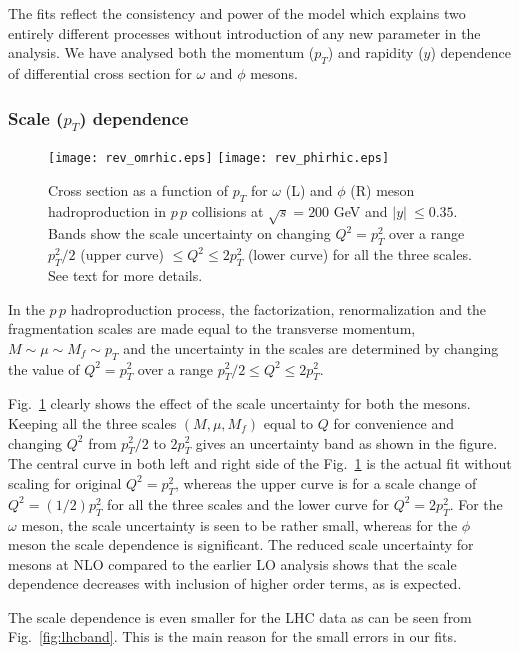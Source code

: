 \documentclass{ws-ijmpa}
\def\om{{\omega}}
\begin{document}
The fits reflect the consistency and power of the model which explains two
entirely different processes without introduction of any new parameter in
the analysis.  We have analysed both the momentum ($p_T$) and rapidity
($y$) dependence of differential cross section for $\omega$ and $\phi$
mesons.

\subsubsection{Scale ($p_T$) dependence} 
\label{sssec:num1}

\begin{figure}[htp]
\texttt{[image: rev\_omrhic.eps]}
\texttt{[image: rev\_phirhic.eps]}
\vspace*{8pt}
\caption{Cross section as a function of $p_T$ for $\omega$ (L) and $\phi$
(R) meson hadroproduction in $p\,p$ collisions at $\sqrt{s} = 200$ GeV and
$\vert y\vert \ \le 0.35$. Bands show the scale uncertainty on changing
$Q^2=p_T^2$ over a range $p_T^2/2$ (upper curve) $\le Q^2 \le 2 p_T^2$
(lower curve) for all the three scales. See text for more details.}
\label{fig:band}
\end{figure}

In the $p\,p$ hadroproduction process, the factorization, renormalization
and the fragmentation scales are made equal to the transverse momentum,
$M \sim \mu \sim M_f \sim p_T$ and the uncertainty in the scales are
determined by changing the value of $Q^2 = p_T^2$ over a range $p_T^2/2
\leq Q^2 \leq 2p_T^2$.%

Fig.~\ref{fig:band} clearly shows the effect of the scale uncertainty for
both the mesons. Keeping all the three scales $(M, \mu, M_f)$ equal to
$Q$ for convenience and changing $Q^2$ from $p_T^2/2$ to $2p_T^2$ gives
an uncertainty band as shown in the figure.  The central curve in both
left and right side of the Fig.~\ref{fig:band} is the actual fit without
scaling for original $Q^2=p_T^2$, whereas the upper curve is for a scale
change of $Q^2 = (1/2) p_T^2$ for all the three scales and the lower curve
for $Q^2 = 2 p_T^2$. For the $\om$ meson, the scale uncertainty is seen
to be rather small, whereas for the $\phi$ meson the scale dependence
is significant. The reduced scale uncertainty for mesons at NLO compared
to the earlier LO analysis\cite{Savilo} shows that the scale dependence
decreases with inclusion of higher order terms, as is expected.

The scale dependence is even smaller for the LHC data as can be seen
from Fig.~\ref{fig:lhcband}. This is the main reason for the small
errors in our fits.
\end{document}
